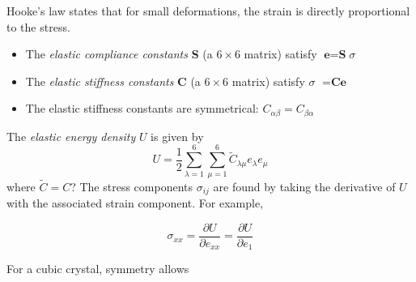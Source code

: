 \documentclass[10pt]{article}
\begin{document}
Hooke's law states that for small deformations, the strain is directly proportional to the stress.
\begin{itemize}
  \item The \emph{elastic compliance constants} \textbf{S} (a $6\times6$ matrix) satisfy
  $\textbf{e} = \textbf{S}$\textbf{$\sigma$}
  \item The \emph{elastic stiffness constants} \textbf{C}  (a $6\times6$ matrix) satisfy
  \textbf{$\sigma$} $ = \textbf{C}\textbf{e}$
  \item The elastic stiffness constants are symmetrical: $C_{\alpha\beta} = C_{\beta\alpha}$
\end{itemize}

The \emph{elastic energy density } $U$ is given by
$$
U = \frac{1}{2}\sum_{\lambda = 1}^{6}\sum_{\mu = 1}^{6}\tilde{C}_{\lambda\mu}e_{\lambda}e_{\mu}
$$
where $\tilde{C} = C$? The stress components $\sigma_{ij}$ are found by taking the derivative of $U$ with the
associated strain component. For example,

$$\sigma_{xx} = \frac{\partial U}{\partial e_{xx}} = \frac{\partial U}{\partial e_{1}}$$

For a cubic crystal, symmetry allows
\end{document}
